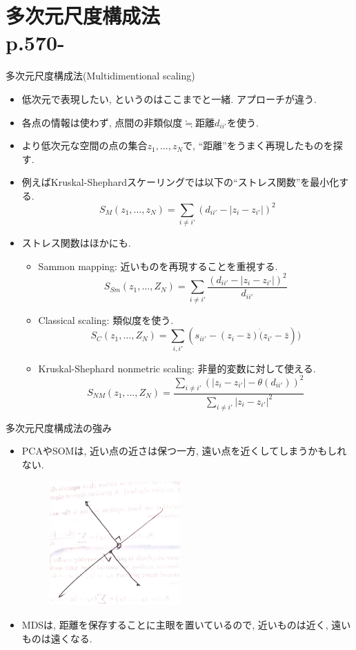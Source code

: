\documentclass[dvipdfmx,8pt]{beamer}
\begin{document}
  \section{多次元尺度構成法\\p.570-}
  \begin{frame}{多次元尺度構成法(Multidimentional scaling)}
    \begin{itemize}
      \item 低次元で表現したい, というのはここまでと一緒. アプローチが違う.
      \item 各点の情報は使わず, 点間の非類似度$\fallingdotseq$距離$d_{ii'}$を使う.
      \item より低次元な空間の点の集合$z_1,\dots,z_N$で, ``距離''をうまく再現したものを探す.
      \item 例えばKruskal-Shephardスケーリングでは以下の``ストレス関数''を最小化する.
        \[
          S_M(z_1,\dots,z_N)=\sum_{i\ne i'}(d_{ii'}-|z_i-z_{i'}|)^2
        \]
      \item ストレス関数はほかにも.
        \begin{itemize}
          \item Sammon mapping: 近いものを再現することを重視する.
            \[
              S_{Sm}(z_1,\dots,Z_N) = \sum_{i\ne i'}\frac{(d_{ii'}-|z_i-z_{i'}|)^2}{d_{ii'}}
            \]
          \item Classical scaling: 類似度を使う.
            \[
              S_C(z_1,\dots,Z_N) = \sum_{i,i'}(s_{ii'}-(z_i-\bar{z}) \dot (z_{i'}-\bar{z}))
            \]
          \item Kruskal-Shephard nonmetric scaling: 非量的変数に対して使える.
            \[
              S_{NM}(z_1,\dots,Z_N) = \frac{\sum_{i\ne i'}(|z_i-z_{i'}|-\theta(d_{ii'}))^2}{\sum_{i\ne i'}|z_i-z_{i'}|^2}
            \]
        \end{itemize}
    \end{itemize}
  \end{frame}
  \begin{frame}{多次元尺度構成法の強み}
    \begin{itemize}
      \item PCAやSOMは, 近い点の近さは保つ一方, 遠い点を近くしてしまうかもしれない.
        \begin{figure}
          \centering
          \includegraphics[width=5cm, clip]{images/pca-low-performance.jpg}
        \end{figure}
      \item MDSは, 距離を保存することに主眼を置いているので, 近いものは近く, 遠いものは遠くなる.
    \end{itemize}
  \end{frame}
\end{document}
